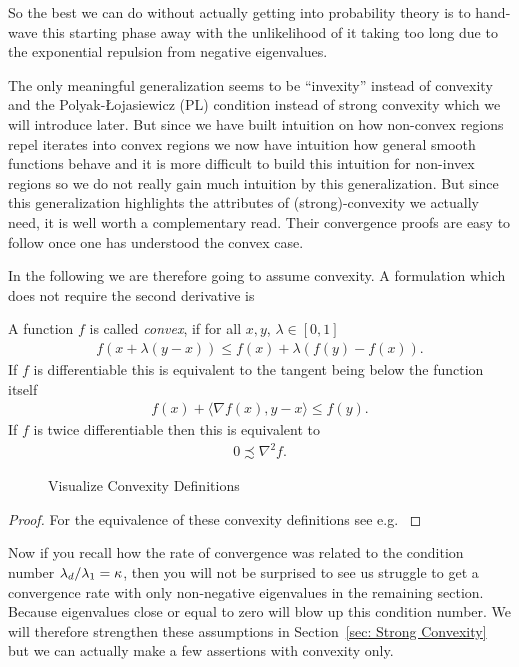 So the best we can do without actually getting into probability theory is to
hand-wave this starting phase away with the unlikelihood of it taking too long
due to the exponential repulsion from negative eigenvalues.

The only meaningful generalization
\parencite[cf.][]{karimiLinearConvergenceGradient2020} seems to be ``invexity''
instead of convexity and the Polyak-\L{}ojasiewicz (PL) condition instead of
strong convexity which we will introduce later. But since we have built
intuition on how non-convex regions repel iterates into convex regions we
now have intuition how general smooth functions behave and it is more difficult
to build this intuition for non-invex regions so we do not really gain much
intuition by this generalization. But since this generalization highlights the
attributes of (strong)-convexity we actually need, it is well worth a
complementary read. Their convergence proofs are easy to follow once one has
understood the convex case.

In the following we are therefore going to assume convexity. A formulation which
does not require the second derivative is
%
\begin{definition}[Convexity]\label{def: convexity}
	A function \(f\) is called \emph{convex}, if for all \(x,y\), \(\lambda\in[0,1]\)
	\begin{align*}
		f(x + \lambda(y-x)) \le f(x) + \lambda (f(y)-f(x)).
	\end{align*}
	If \(f\) is differentiable this is equivalent to the tangent being below
	the function itself
	\begin{align*}
		f(x) + \langle\nabla f(x), y-x\rangle \le f(y).
	\end{align*}
	If \(f\) is twice differentiable then this is equivalent to
	\begin{align*}
		0\precsim\nabla^2 f.
	\end{align*}
 \end{definition}
%
\begin{figure}[h]
	\centering
	\def\svgwidth{1\textwidth}
	
	\caption{Visualize Convexity Definitions}
	\label{fig: visualize convexity definition}
\end{figure}
%
\begin{proof}
	For the equivalence of these convexity definitions see e.g. \textcite[Theorem
	2.1.2, 2.1.4]{nesterovLecturesConvexOptimization2018}
 \end{proof}
%
\begin{remark}
	Now if you recall how the rate of convergence was related to the condition number
	\(\lambda_d/\lambda_1 =\kappa\), then you will not be surprised to see us 
	struggle to get a convergence rate with only non-negative eigenvalues in 
	the remaining section. Because eigenvalues close or equal to zero will blow up this
	condition number. We will therefore strengthen these assumptions in
	Section~\ref{sec: Strong Convexity} but we can actually make a few assertions
	with convexity only.
\end{remark}

